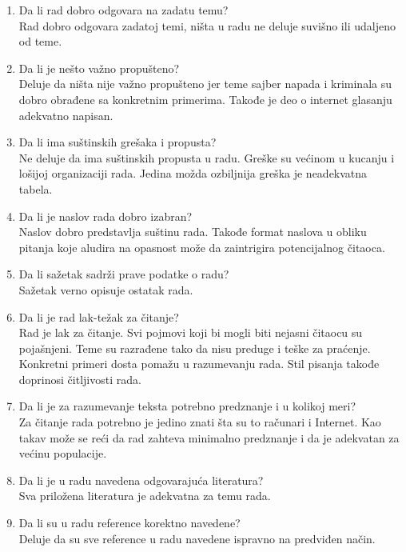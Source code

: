 \documentclass[a4paper]{report}
\begin{document}
\begin{enumerate}
\item Da li rad dobro odgovara na zadatu temu?\\
Rad dobro odgovara zadatoj temi, ništa u radu ne deluje suvišno ili udaljeno od teme.

\item Da li je nešto važno propušteno?\\
Deluje da ništa nije važno propušteno jer teme sajber napada i kriminala su dobro obrađene sa konkretnim primerima. Takođe je deo o internet glasanju adekvatno napisan.

\item Da li ima suštinskih grešaka i propusta?\\
Ne deluje da ima suštinskih propusta u radu. Greške su većinom u kucanju i lošijoj organizaciji rada. Jedina možda ozbiljnija greška je neadekvatna tabela.

\item Da li je naslov rada dobro izabran?\\
Naslov dobro predstavlja suštinu rada. Takođe format naslova u obliku pitanja koje aludira na opasnost može da zaintrigira potencijalnog čitaoca.

\item Da li sažetak sadrži prave podatke o radu?\\
Sažetak verno opisuje ostatak rada.

\item Da li je rad lak-težak za čitanje?\\
Rad je lak za čitanje. Svi pojmovi koji bi mogli biti nejasni čitaocu su pojašnjeni. Teme su razrađene tako da nisu preduge i teške za praćenje. Konkretni primeri dosta pomažu u razumevanju rada. Stil pisanja takođe doprinosi čitljivosti rada.

\item Da li je za razumevanje teksta potrebno predznanje i u kolikoj meri?\\
Za čitanje rada potrebno je jedino znati šta su to računari i Internet. Kao takav može se reći da rad zahteva minimalno predznanje i da je adekvatan za većinu populacije.

\item Da li je u radu navedena odgovarajuća literatura?\\
Sva priložena literatura je adekvatna za temu rada.

\item Da li su u radu reference korektno navedene?\\
Deluje da su sve reference u radu navedene ispravno na predviđen način.


\end{enumerate}
\end{document}
